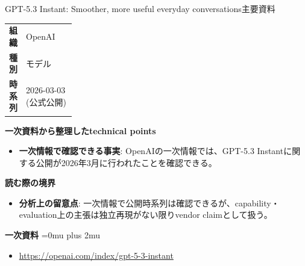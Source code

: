 \begin{technicalnote}{GPT-5.3 Instant: Smoother, more useful everyday conversations}{主要資料}
\begingroup
\begin{tabularx}{\linewidth}{@{}>{\bfseries}p{0.22\linewidth}X@{}}
組織 & OpenAI \\
種別 & モデル \\
時系列 & 2026-03-03 (公式公開) \\
\end{tabularx}
\smallskip
{\bfseries 一次資料から整理したtechnical points}
\begin{itemize}[leftmargin=1.5em,itemsep=0.35em]
\item \textbf{一次情報で確認できる事実}: OpenAIの一次情報では、GPT-5.3 Instantに関する公開が2026年3月に行われたことを確認できる。
\end{itemize}
\begin{minipage}{\linewidth}
{\bfseries 読む際の境界}
\begin{itemize}[leftmargin=1.5em,itemsep=0.35em]
\item \textbf{分析上の留意点}: 一次情報で公開時系列は確認できるが、capability・evaluation上の主張は独立再現がない限りvendor claimとして扱う。
\end{itemize}
\begin{samepage}
{\bfseries 一次資料}
\begingroup\sloppy
\Urlmuskip=0mu plus 2mu\relax
\begin{itemize}[leftmargin=1.5em,itemsep=0.25em]
\item {\scriptsize\url{https://openai.com/index/gpt-5-3-instant}}
\end{itemize}
\endgroup
\end{samepage}
\end{minipage}
\endgroup
\end{technicalnote}
\medskip

